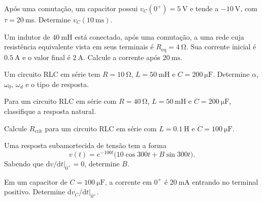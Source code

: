 \begin{questao}[2]{}

Após uma comutação, um capacitor possui $v_C(0^+)=\SI{5}{\volt}$ e tende a
$-\SI{10}{\volt}$, com $\tau=\SI{20}{\milli\second}$. Determine
$v_C(\SI{10}{\milli\second})$.


\end{questao}
\begin{questao}[2]{}

Um indutor de $\SI{40}{\milli\henry}$ está conectado, após uma
comutação, a uma rede cuja resistência equivalente vista em seus terminais é
$R_{\mathrm{eq}}=\SI{4}{\ohm}$. Sua corrente inicial é $\SI{0.5}{\ampere}$ e o valor final é
$\SI{2}{\ampere}$. Calcule a corrente após $\SI{20}{\milli\second}$.


\end{questao}
\begin{questao}[2]{}

Um circuito RLC em série tem $R=\SI{10}{\ohm}$, $L=\SI{50}{\milli\henry}$ e
$C=\SI{200}{\micro\farad}$. Determine $\alpha$, $\omega_0$, $\omega_d$ e o tipo
de resposta.


\end{questao}
\begin{questao}[2]{}

Para um circuito RLC em série com $R=\SI{40}{\ohm}$, $L=\SI{50}{\milli\henry}$ e
$C=\SI{200}{\micro\farad}$, classifique a resposta natural.


\end{questao}
\begin{questao}[2]{}

Calcule $R_{\mathrm{crit}}$ para um circuito RLC em série com $L=\SI{0.1}{\henry}$ e
$C=\SI{100}{\micro\farad}$.


\end{questao}
\begin{questao}[2]{}

Uma resposta subamortecida de tensão tem a forma
\[
v(t)=e^{-100t}\big(10\cos300t+B\sin300t\big).
\]
Sabendo que $\mathrm{d}v/\mathrm{d}t|_{0^+}=0$, determine $B$.


\end{questao}
\begin{questao}[2]{}

Em um capacitor de $C=\SI{100}{\micro\farad}$, a corrente em $0^+$ é
$\SI{20}{\milli\ampere}$ entrando no terminal positivo. Determine
$\mathrm{d}v_C/\mathrm{d}t|_{0^+}$.


\end{questao}
